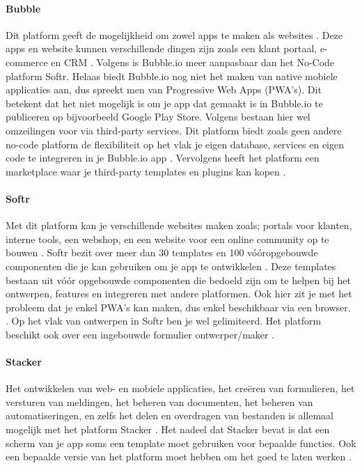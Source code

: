 \paragraph{Bubble}
Dit platform geeft de mogelijkheid om zowel apps te maken als websites \autocite{Youssef2023}. 
Deze apps en website kunnen verschillende dingen zijn zoals een klant portaal, e-commerce en CRM \autocite{Sharma2022}. 
Volgens \textcite{Youssef2023} is Bubble.io meer aanpasbaar dan het No-Code platform Softr. Helaas biedt Bubble.io nog niet het maken van native mobiele applicaties aan, dus spreekt men van Progressive Web Apps (PWA’s). 
Dit betekent dat het niet mogelijk is om je app dat gemaakt is in Bubble.io te publiceren op bijvoorbeeld Google Play Store. Volgens \textcite{Sharma2022} bestaan hier wel omzeilingen voor via third-party services. Dit platform biedt zoals geen andere no-code platform de flexibiliteit op het vlak je eigen database, services en eigen code te integreren in je Bubble.io app \autocite{Bas2024}. 
Vervolgens heeft het platform een marketplace waar je third-party templates en plugins kan kopen \autocite{Sharma2022}. 
\paragraph{Softr}
Met dit platform kan je verschillende websites maken zoals; portals voor klanten, interne tools, een webshop, en een website voor een online community op te bouwen\autocite{Code2023} \autocite{Youssef2023} .
Softr bezit over meer dan 30 templates en 100 vóóropgebouwde componenten die je kan gebruiken om je app te 
ontwikkelen \autocite{Frater2024} \autocite{Youssef2023}. 
Deze templates bestaan uit vóór opgebouwde componenten die bedoeld zijn om te helpen bij het ontwerpen, features en integreren met andere platformen. 
Ook hier zit je met het probleem dat je enkel PWA’s kan maken, dus enkel beschikbaar via een browser. \autocite{Frater2024}. 
Op het vlak van ontwerpen in Softr ben je wel gelimiteerd. Het platform beschikt ook over een ingebouwde formulier ontwerper/maker \autocite{Youssef2023}. 

\paragraph{Stacker}
Het ontwikkelen van web- en mobiele applicaties, het creëren van formulieren, het versturen van meldingen, het beheren van documenten, 
het beheren van automatiseringen, en zelfs het delen en overdragen van bestanden is allemaal mogelijk met het platform 
Stacker \autocite{JDN2023}. 
Het nadeel dat Stacker bevat is dat een scherm van je app soms een template moet gebruiken voor bepaalde functies. 
Ook een bepaalde versie van het platform moet hebben om het goed te laten werken \autocite{Advice}.
